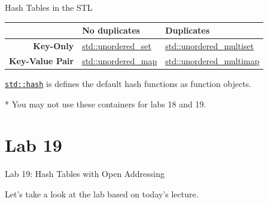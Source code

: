 \documentclass[14pt,aspectratio=1610]{beamer}
\begin{document}
\begin{frame}{Hash Tables in the STL}

  \begin{tabular}{r  l  l}
    \toprule%
      & \textbf{No duplicates} & \textbf{Duplicates} \\
    \midrule%
      \textbf{Key-Only}
        & \href{https://en.cppreference.com/w/cpp/container/unordered_set}{{\small{}std::}unordered\_set}
        & \href{https://en.cppreference.com/w/cpp/container/unordered_multiset}{{\small{}std::}unordered\_multiset} \\
      \textbf{Key-Value Pair}
        & \href{https://en.cppreference.com/w/cpp/container/unordered_map}{{\small{}std::}unordered\_map}
        & \href{https://en.cppreference.com/w/cpp/container/unordered_multimap}{{\small{}std::}unordered\_multimap}\\
    \bottomrule%
  \end{tabular}
  \vspace{0.25em}

  \href{https://en.cppreference.com/w/cpp/utility/hash}{\texttt{std::hash}} is defines the default hash functions as function objects.
  \vspace{0.25em}
  
  * You may not use these containers for labs 18 and 19.
\end{frame}


\section*{Lab 19}
\begin{frame}{Lab 19: Hash Tables with Open Addressing}
\begin{center}\Large
Let's take a look at the lab based on today's lecture.
\end{center}
\end{frame}
\end{document}
